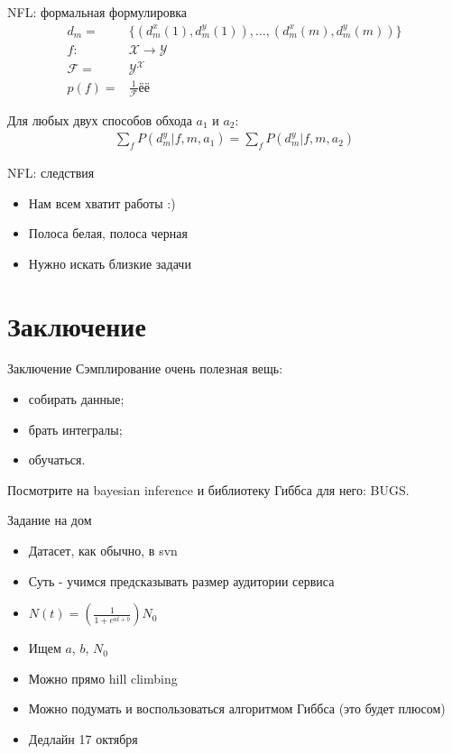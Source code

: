 \documentclass[14pt, fleqn, xcolor={dvipsnames, table}]{beamer}
\begin{document}
\begin{frame}{NFL: формальная формулировка}
$$\begin{array}{rl}
d_m =& \{(d^x_m(1), d^y_m(1)), \ldots, (d^x_m(m), d^y_m(m))\} \\
f: & \mathcal{X} \to \mathcal{Y} \\
\mathcal{F}= & \mathcal{Y}^\mathcal{X} \\
p(f) = & \frac{1}{\mathcal{F}} ёё
\end{array}$$

\begin{theorem}
Для любых двух способов обхода $a_1$ и $a_2$:
$$\begin{array}{rl}
\sum_f P(d^y_m|f,m,a_1) = \sum_f P(d^y_m|f,m,a_2)
\end{array}$$
\end{theorem}
\end{frame}

\begin{frame}{NFL: следствия}
\begin{itemize}
  \item Нам всем хватит работы :)
  \item Полоса белая, полоса черная
  \item Нужно искать близкие задачи
\end{itemize}
\end{frame}

\section{Заключение}
\begin{frame}{Заключение}
Сэмплирование очень полезная вещь:
\begin{itemize}
  \item собирать данные;
  \item брать интегралы;
  \item обучаться.
\end{itemize}
Посмотрите на bayesian inference и библиотеку Гиббса для него: BUGS.
\end{frame}

\begin{frame}{Задание на дом}
\begin{itemize}
  \item Датасет, как обычно, в svn
  \item Суть - учимся предсказывать размер аудитории сервиса
  \item $N(t) = (\frac{1}{1 + e^{at+b}})N_0$
  \item Ищем $a$, $b$, $N_0$
  \item Можно прямо hill climbing
  \item Можно подумать и воспользоваться алгоритмом Гиббса (это будет плюсом)
  \item Дедлайн 17 октября
\end{itemize}
\end{frame}
\end{document}
